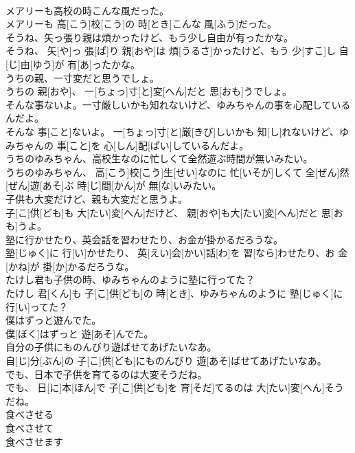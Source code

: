 \documentclass[8pt]{extreport}
\begin{document}
\begin{CJK}{UTF8}{min}
\\	メアリーも高校の時こんな風だった。	
\\	メアリーも 高[こう]校[こう]の 時[とき]こんな 風[ふう]だった。
\\	そうね、矢っ張り親は煩かったけど、もう少し自由が有ったかな。	
\\	そうね、 矢[や]っ 張[ぱ]り 親[おや]は 煩[うるさ]かったけど、もう 少[すこ]し 自[じ]由[ゆう]が 有[あ]ったかな。
\\	うちの親、一寸変だと思うでしょ。	
\\	うちの 親[おや]、 一[ちょっ]寸[と]変[へん]だと 思[おも]うでしょ。
\\	そんな事ないよ。一寸厳しいかも知れないけど、ゆみちゃんの事を心配しているんだよ。	
\\	そんな 事[こと]ないよ。 一[ちょっ]寸[と]厳[きび]しいかも 知[し]れないけど、ゆみちゃんの 事[こと]を 心[しん]配[ぱい]しているんだよ。
\\	うちのゆみちゃん、高校生なのに忙しくて全然遊ぶ時間が無いみたい。	
\\	うちのゆみちゃん、 高[こう]校[こう]生[せい]なのに 忙[いそが]しくて 全[ぜん]然[ぜん]遊[あそ]ぶ 時[じ]間[かん]が 無[な]いみたい。
\\	子供も大変だけど、親も大変だと思うよ。	
\\	子[こ]供[ども]も 大[たい]変[へん]だけど、 親[おや]も大[たい]変[へん]だと 思[おも]うよ。
\\	塾に行かせたり、英会話を習わせたり、お金が掛かるだろうな。	
\\	塾[じゅく]に 行[い]かせたり、 英[えい]会[かい]話[わ]を 習[なら]わせたり、お 金[かね]が 掛[か]かるだろうな。
\\	たけし君も子供の時、ゆみちゃんのように塾に行ってた？	
\\	たけし 君[くん]も 子[こ]供[ども]の 時[とき]、ゆみちゃんのように 塾[じゅく]に 行[い]ってた？
\\	僕はずっと遊んでた。	
\\	僕[ぼく]はずっと 遊[あそ]んでた。
\\	自分の子供にものんびり遊ばせてあげたいなあ。	
\\	自[じ]分[ぶん]の 子[こ]供[ども]にものんびり 遊[あそ]ばせてあげたいなあ。
\\	でも、日本で子供を育てるのは大変そうだね。	
\\	でも、 日[に]本[ほん]で 子[こ]供[ども]を 育[そだ]てるのは 大[たい]変[へん]そうだね。
\\	食べさせる 
\\	食べさせて 
\\	食べさせます	

\end{CJK}
\end{document}

